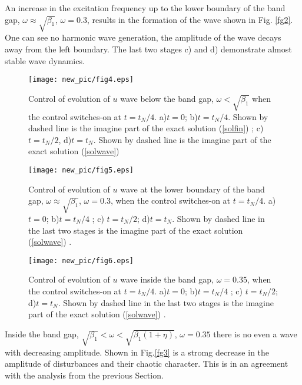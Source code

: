 An increase in the excitation frequency up to  the lower boundary of the band gap, $\omega \approx \sqrt{\beta_1}$,  $\omega=0.3$,  results in the formation of the wave shown in Fig. \ref{fg2}. One can see no harmonic wave generation, the amplitude of the wave decays away from the left boundary. The last two stages c) and d) demonstrate almost stable wave dynamics.
\begin{figure*}
\begin{center}
\texttt{[image: new\_pic/fig4.eps]}
\end{center}
\caption{ Control of evolution of $u$ wave below the band gap, $\omega<\sqrt{\beta_1}$ when the control switches-on at $t=t_N/4$.   a)$t=0$; b)$ t=t_N/4$. Shown by dashed line is the imagine part of the  exact solution (\ref{solfin}) ; c) $t=t_N/2$, d)$t=t_N$. Shown by dashed line is the imagine part of the  exact solution (\ref{solwave}) }
\label{fg4}
  \end{figure*}
\begin{figure*}
\begin{center}
\texttt{[image: new\_pic/fig5.eps]}
\end{center}
\caption{Control of evolution of $u$ wave at the lower boundary of  the band gap, $\omega \approx \sqrt{\beta_1}$, $\omega=0.3$,  when the control switches-on at $t=t_N/4$.   a)$t=0$; b)$ t=t_N/4$ ; c) $t=t_N/2$; d)$t=t_N$. Shown by dashed line in the last two stages  is the imagine part of the  exact solution (\ref{solwave}) .}
\label{fg5}
  \end{figure*}
  
  \begin{figure*}[ht]
\begin{center}
\texttt{[image: new\_pic/fig6.eps]}
\end{center}
\caption{Control of evolution of $u$ wave inside  the band gap, $\omega=0.35$,  when the control switches-on at $t=t_N/4$.   a)$t=0$; b)$ t=t_N/4$ ; c) $t=t_N/2$; d)$t=t_N$. Shown by dashed line in the last two stages  is the imagine part of the  exact solution (\ref{solwave}) .}
\label{fg6}
  \end{figure*}
Inside the band gap, $\sqrt{\beta_1}<\omega<\sqrt{\beta_1(1+\eta)}$,  $\omega=0.35$ there is no even a wave with decreasing amplitude. Shown in Fig.\ref{fg3} is a stromg decrease in the amplitude of disturbances and their chaotic character. This is in an agreement with the analysis from the previous Section.



